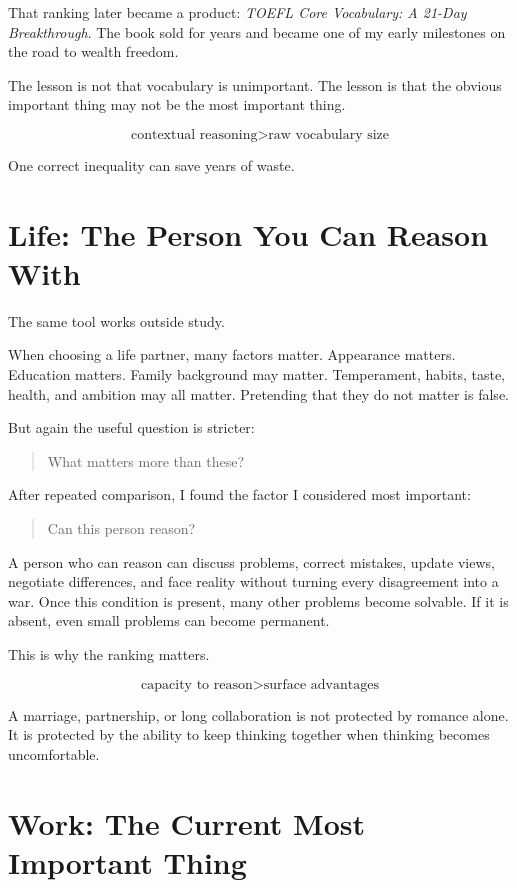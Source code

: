 That ranking later became a product: \emph{TOEFL Core Vocabulary: A 21-Day Breakthrough}. The book sold for years and became one of my early milestones on the road to wealth freedom.

The lesson is not that vocabulary is unimportant. The lesson is that the obvious important thing may not be the most important thing.

\[
\text{contextual reasoning} > \text{raw vocabulary size}
\]

One correct inequality can save years of waste.

\section*{Life: The Person You Can Reason With}

The same tool works outside study.

When choosing a life partner, many factors matter. Appearance matters. Education matters. Family background may matter. Temperament, habits, taste, health, and ambition may all matter. Pretending that they do not matter is false.

But again the useful question is stricter:

\begin{quote}
What matters more than these?
\end{quote}

After repeated comparison, I found the factor I considered most important:

\begin{quote}
Can this person reason?
\end{quote}

A person who can reason can discuss problems, correct mistakes, update views, negotiate differences, and face reality without turning every disagreement into a war. Once this condition is present, many other problems become solvable. If it is absent, even small problems can become permanent.

This is why the ranking matters.

\[
\text{capacity to reason} > \text{surface advantages}
\]

A marriage, partnership, or long collaboration is not protected by romance alone. It is protected by the ability to keep thinking together when thinking becomes uncomfortable.

\section*{Work: The Current Most Important Thing}

